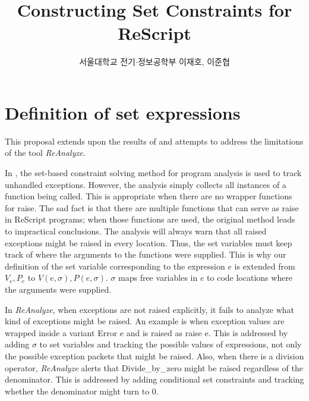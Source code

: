 \documentclass{article}
\title{Constructing Set Constraints for ReScript}
\author{서울대학교 전기$\cdot$정보공학부 이재호, 이준협}
\date{}
\newcommand*{\Reanalyze}{\textit{ReAnalyze}}
\begin{document}
\maketitle

\section{Definition of set expressions}

This proposal extends upon the results of \cite{YiRyu97} and attempts to address the limitations of the tool \Reanalyze.

In \cite{YiRyu97}, the set-based constraint solving method for program analysis is used to track unhandled exceptions.
However, the analysis simply collects all instances of a function being called.
This is appropriate when there are no wrapper functions for \textsf{raise}.
The sad fact is that there are multiple functions that can serve as \textsf{raise} in ReScript programs; when those functions are used, the original method leads to impractical conclusions.
The analysis will always warn that all raised exceptions might be raised in every location.
Thus, the set variables must keep track of where the arguments to the functions were supplied.
This is why our definition of the set variable corresponding to the expression $e$ is extended from $V_{e},P_{e}$ to $V(e,\sigma),P(e,\sigma)$.
$\sigma$ maps free variables in $e$ to code locations where the arguments were supplied.

In \Reanalyze, when exceptions are not raised explicitly, it fails to analyze what kind of exceptions might be raised.
An example is when exception values are wrapped inside a variant \textsf{Error e} and is raised as \textsf{raise e}.
This is addressed by adding $\sigma$ to set variables and tracking the possible values of expressions, not only the possible exception packets that might be raised.
Also, when there is a division operator, \Reanalyze{} alerts that \textsf{Divide\_by\_zero} might be raised regardless of the denominator.
This is addressed by adding conditional set constraints and tracking whether the denominator might turn to 0.
\end{document}
